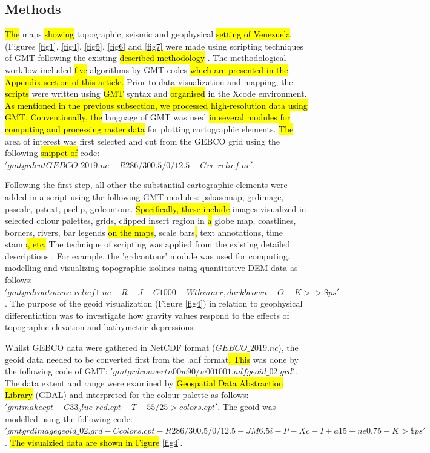 \documentclass[sustainability,article,submit,pdftex,moreauthors]{Definitions/mdpi}
\begin{document}
\subsection{Methods}
\hl{The }maps \hl{showing }topographic, seismic and geophysical \hl{setting of Venezuela }(Figures \ref{fig1}, \ref{fig4}, \ref{fig5}, \ref{fig6} and \ref{fig7} were made using scripting techniques\hl{ }of\hl{ }GMT \cite{Wessel} following the existing \hl{described methodology }\citep{Lemenkova2022b,Lemenkova202217}. The methodological workflow included \hl{five }algorithms by GMT codes \hl{which are presented in the Appendix section of this article.} Prior to data visualization and mapping, the\hl{ scripts }were written using \hl{GMT} syntax and \hl{organised }in the Xcode environment. \hl{As mentioned in the previous subsection, we processed high-resolution data using GMT. Conventionally, the }language of GMT was used \hl{in several modules for computing and processing raster data }for plotting\hl{ }cartographic elements. \hl{The} area of interest was first selected and cut from the GEBCO grid using the following \hl{snippet of }code: $'gmt grdcut GEBCO\_2019.nc -R286/300.5/0/12.5 -Gve\_relief.nc'.$

Following the first step, all other the substantial cartographic elements\hl{ }were added in a script using the following GMT modules: psbasemap, grdimage, psscale, pstext, psclip, grdcontour. \hl{Specifically, these include} images visualized in selected colour palettes, grids, clipped insert region\hl{ }in\hl{ a }globe map, coastlines, borders, rivers, bar legends \hl{on the maps}, scale bars\hl{, }text annotations, time stamp\hl{, etc. }The technique of scripting was applied from the existing detailed descriptions \cite{Lemenkova2021b}. For example, the 'grdcontour' module was used for computing, modelling and visualizing topographic isolines using quantitative DEM data as follows: $'gmt grdcontour ve\_relief1.nc -R -J -C1000 -Wthinner,darkbrown -O -K >> \$ps'$. The purpose of the geoid visualization (Figure \ref{fig4}) in relation to geophysical differentiation was to investigate how gravity values respond to the effects of topographic elevation and bathymetric depressions. 

Whilst GEBCO data were gathered in NetCDF format ($GEBCO\_2019.nc$), the geoid data needed to be converted first from the .adf format\hl{. This }was done by the following code of GMT: $'gmt grdconvert n00w90/w001001.adf geoid\_02.grd'.$ The data extent and range were examined by \hl{Geospatial Data Abstraction Library }(GDAL) and interpreted for the colour palette as follows: $'gmt makecpt -C33_blue\_red.cpt -T-55/25 > colors.cpt'.$ The geoid was modelled using the following code: $'gmt grdimage geoid\_02.grd -Ccolors.cpt -R286/300.5/0/12.5 -JM6.5i -P -Xc -I+a15+ne0.75 -K > \$ps'$. \hl{The visualzied data are shown in Figure} \ref{fig4}. 
\end{document}
